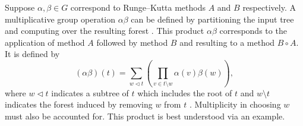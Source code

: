 



Suppose $\alpha, \beta \in G$ correspond to Runge--Kutta methods $A$ and $B$ respectively.
A multiplicative group operation $\alpha\beta$ can be defined
by partitioning the input tree and
computing over the resulting forest \cite{Butcher2008_book}.
This product $\alpha\beta$ corresponds to the application
of method $A$ followed by method $B$ and resulting to a method $B \circ A$.
It is defined by
\begin{equation}\label{eq:Group_operation}
  (\alpha\beta)(t) = \sum_{w \lhd t} \left(\prod_{v \in t \setminus w} \alpha(v)\beta(w)\right),
\end{equation}
where $w \lhd t$ indicates a subtree of $t$ which includes the
root of $t$ and $w \setminus t$ indicates the forest induced
by removing $w$ from $t$ \cite{Butcher2008_book}.
Multiplicity in choosing $w$ must also be accounted for.
This product is best understood via an example.


